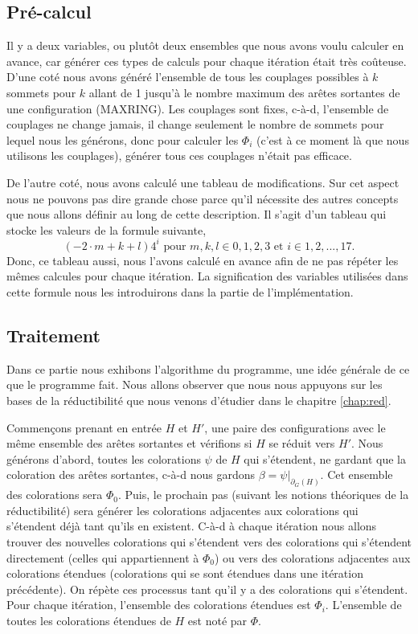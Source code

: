 \documentclass[10pt,a4paper]{article}
\begin{document}
\subsection{Pré-calcul}

Il y a deux variables, ou plutôt deux ensembles que nous avons voulu calculer en avance, car générer ces types de calculs pour chaque itération était très coûteuse. D'une coté nous avons généré l'ensemble de tous les couplages possibles à $k$ sommets pour $k$ allant de 1 jusqu'à le nombre maximum des arêtes sortantes de une configuration (MAXRING). Les couplages sont fixes, c-à-d, l'ensemble de couplages ne change jamais, il change seulement le nombre de sommets pour lequel nous les générons, donc pour calculer les $\Phi_i$ (c'est à ce moment là que nous utilisons les couplages), générer tous ces couplages n'était pas efficace. 

De l'autre coté, nous avons calculé une tableau de modifications. Sur cet aspect nous ne pouvons pas dire grande chose parce qu'il nécessite des autres concepts que nous allons définir au long de cette description. Il s'agit d'un tableau qui stocke les valeurs de la formule suivante,
$$
(-2\cdot m + k + l)4^i \textrm{  pour $m, k, l \in {0,1,2,3}$ et $i \in {1,2,...,17}$}.
$$
Donc, ce tableau aussi, nous l'avons calculé en avance afin de ne pas répéter les mêmes calcules pour chaque itération. La signification des variables utilisées dans cette formule nous les introduirons dans la partie de l'implémentation.

\subsection{Traitement}

Dans ce partie nous exhibons l'algorithme du programme, une idée générale de ce que le programme fait. Nous allons observer que nous nous appuyons sur les bases de la réductibilité que nous venons d'étudier dans le chapitre \ref{chap:red}. 

Commençons prenant en entrée $H$ et $H'$, une paire des configurations avec le même ensemble des arêtes sortantes et vérifions si $H$ se réduit vers $H'$. Nous générons d'abord, toutes les colorations $\psi$ de $H$ qui s'étendent, ne gardant que la coloration des arêtes sortantes, c-à-d nous gardons $\beta = \psi|_{\partial_G(H)}$. Cet ensemble des colorations sera $\Phi_0$. Puis, le prochain pas (suivant les notions théoriques de la réductibilité) sera générer les colorations adjacentes aux colorations qui s'étendent déjà tant qu'ils en existent. C-à-d à chaque itération nous allons trouver des nouvelles colorations qui s'étendent vers des colorations qui s'étendent directement (celles qui appartiennent à $\Phi_0$) ou vers des colorations adjacentes aux colorations étendues (colorations qui se sont étendues dans une itération précédente). On répète ces processus tant qu'il y a des colorations qui s'étendent. Pour chaque itération, l'ensemble des colorations étendues est $\Phi_i$. L'ensemble de toutes les colorations étendues de $H$ est noté par $\Phi$.
\end{document}
